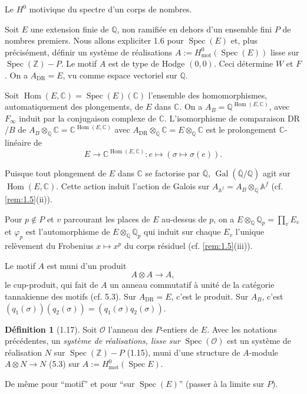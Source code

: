 \documentclass[12pt,a4paper]{article}
\theoremstyle{plain}
\theoremstyle{definition}
\newtheorem{definition}[theorem]{D\'efinition}
\theoremstyle{remark}
\DeclareMathOperator{\Spec}{Spec}
\DeclareMathOperator{\Hom}{Hom}
\DeclareMathOperator{\Gal}{Gal}
\newcommand{\mot}{\mathrm{mot}}
\providecommand{\Hom}{\operatorname{Hom}}
\providecommand{\Gal}{\operatorname{Gal}}
\providecommand{\Spec}{\operatorname{Spec}}
\providecommand{\mot}{\mathrm{mot}}
\providecommand{\DR}{\mathrm{DR}}
\begin{document}
\begin{exemple}[1.16]\label{ex:1.16}
Le $H^0$ motivique du spectre d'un corps de nombres.

Soit $E$ une extension finie de $\mathbb{Q}$, non ramifi\'ee en dehors d'un ensemble fini
$P$ de nombres premiers. Nous allons expliciter 1.6 pour $\Spec(E)$ et, plus
pr\'ecis\'ement, d\'efinir un syst\`eme de r\'ealisations $A := H^0_\mot(\Spec(E))$
lisse sur $\Spec(\mathbb{Z}) - P$. Le motif $A$ est de type de Hodge $(0,0)$. Ceci
d\'etermine $W$ et $F$. On a $A_{\DR} = E$, vu comme espace vectoriel sur $\mathbb{Q}$.

Soit $\Hom(E, \mathbb{C}) = \Spec(E)(\mathbb{C})$ l'ensemble des homomorphismes,
automatiquement des plongements, de $E$ dans $\mathbb{C}$. On a $A_B =
\mathbb{Q}^{\Hom(E,\mathbb{C})}$, avec $F_\infty$ induit par la conjugaison complexe de
$\mathbb{C}$. L'isomorphisme de comparaison $\DR$/$B$ de $A_B \otimes_{\mathbb{Q}}
\mathbb{C} = \mathbb{C}^{\Hom(E,\mathbb{C})}$ avec $A_{\DR} \otimes_{\mathbb{Q}}
\mathbb{C} = E \otimes_{\mathbb{Q}} \mathbb{C}$ est le prolongement $\mathbb{C}$-lin\'eaire de
\[
E \longrightarrow \mathbb{C}^{\Hom(E,\mathbb{C})}: e \longmapsto (\sigma \mapsto
\sigma(e)).
\]

Puisque tout plongement de $E$ dans $\mathbb{C}$ se factorise par
$\overline{\mathbb{Q}}$, $\Gal(\overline{\mathbb{Q}}/\mathbb{Q})$ agit sur
$\Hom(E, \mathbb{C})$. Cette action induit l'action de Galois sur $A_{\mathbb{A}^f} =
A_B \otimes_{\mathbb{Q}} \mathbb{A}^f$ (cf. \ref{rem:1.5}(ii)).

Pour $p \notin P$ et $v$ parcourant les places de $E$ au-dessus de $p$, on a $E
\otimes_{\mathbb{Q}} \mathbb{Q}_p = \prod_v E_v$ et $\varphi_p$ est l'automorphisme de $E
\otimes_{\mathbb{Q}} \mathbb{Q}_p$ qui induit sur chaque $E_v$ l'unique rel\`evement du
Frobenius $x \mapsto x^p$ du corps r\'esiduel (cf. \ref{rem:1.5}(iii)).

Le motif $A$ est muni d'un produit
\begin{equation}\label{eq:1.16.1}
A \otimes A \longrightarrow A,
\end{equation}
le cup-produit, qui fait de $A$ un anneau commutatif \`a unit\'e de la cat\'egorie
tannakienne des motifs (cf. 5.3). Sur $A_{\DR} = E$, c'est le produit. Sur $A_B$,
c'est $(q_1(\sigma))(q_2(\sigma)) = (q_1(\sigma)q_2(\sigma))$.
\end{exemple}

\begin{definition}[1.17]\label{def:1.17}
Soit $\mathcal{O}$ l'anneau des $P$-entiers de $E$. Avec les notations pr\'ec\'edentes, un
\emph{syst\`eme de r\'ealisations, lisse sur} $\Spec(\mathcal{O})$ est un syst\`eme de
r\'ealisation $N$ sur $\Spec(\mathbb{Z}) - P$ (1.15), muni d'une structure de
$A$-module $A \otimes N \to N$ (5.3) sur $A := H^0_\mot(\Spec E)$.

De m\^eme pour ``motif'' et pour ``sur $\Spec(E)$'' (passer \`a la limite sur $P$).
\end{definition}
\end{document}
